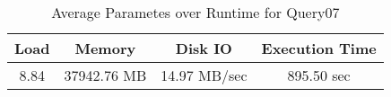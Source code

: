 \documentclass[../../main.tex]{subfiles}
\begin{document}
    \begin{table}
        \begin{center}
            \begin{tabular}{ |c|c|c|c| } 
            \hline
            Load & Memory & Disk IO & Execution Time\\
            \hline
            8.84 & 37942.76 MB & 14.97 MB/sec & 895.50 sec \\
            \hline
            \end{tabular}
            \\[1pt]
            \caption{Average Parametes over Runtime for Query07}
        \end{center}
    \end{table}
    \pagebreak
\end{document}

